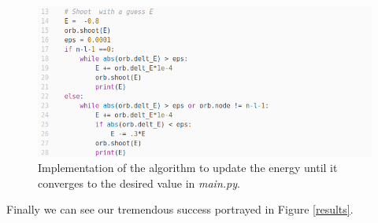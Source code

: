 \documentclass[12pt]{article}
\begin{document}
\begin{figure}[h!]
    \centering
    \includegraphics[width=\linewidth]{shoot}
    \caption{Implementation of the algorithm to update the energy until it converges to the desired value in \textit{main.py}.}
    \label{shoot}
\end{figure}

Finally we can see our tremendous success portrayed in Figure \ref{results}.
\end{document}
